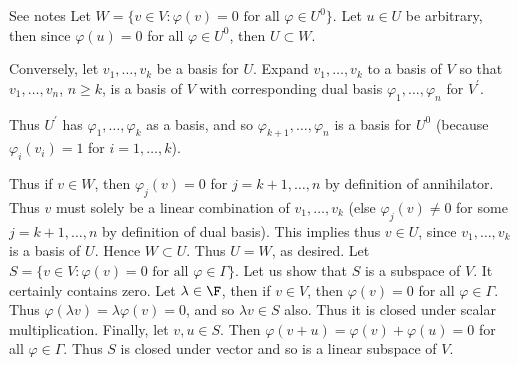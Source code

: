 \documentclass{book}
\begin{document}
\begin{enumerate}[label=\arabic*)]
\begin{enumerate}[label=\alph*)]
      \end{enumerate}
    \ii
      See notes
    \ii
      Let $W = \{v \in V: \varphi(v) = 0 \text{ for all } \varphi \in U^0\}$. Let $u \in U$ be arbitrary, then since $\varphi(u) = 0$ for all $\varphi \in U^0$, then $U \subset W$. 

      Conversely, let $v_1, \dots, v_k$ be a basis for $U$. Expand $v_1, \dots, v_k$ to a basis of $V$ so that $v_1, \dots, v_n$, $n \geq k$, is a basis of $V$ with corresponding dual basis
      $\varphi_1, \dots, \varphi_n$ for $V^{\prime}$. 

      Thus $U^{\prime}$ has $\varphi_1, \dots, \varphi_k$ as a basis, and so $\varphi_{k + 1}, \dots, \varphi_{n}$ is a basis for $U^0$ (because $\varphi_i(v_i) = 1$ for $i = 1, \dots, k$). 

      Thus if $v \in W$, then $\varphi_j(v) = 0$ for $j = k + 1, \dots, n$ by definition of annihilator. Thus $v$ must solely be a linear combination of $v_1, \dots, v_k$ (else
      $\varphi_{j}(v) \neq 0$ for some $j = k + 1, \dots, n$ by definition of dual basis). This implies thus $v \in U$, since $v_1, \dots, v_k$ is a basis of $U$. Hence $W \subset U$. Thus
      $U = W$, as desired.
    \ii
      Let $S = \{v \in V: \varphi(v) = 0 \text { for all } \varphi \in \Gamma\}$. Let us show that $S$ is a subspace of $V$. It certainly contains zero. Let $\lambda \in \F$, then if $v \in
      V$, then $\varphi(v) = 0$ for all $\varphi \in \Gamma$. Thus $\varphi(\lambda v) = \lambda\varphi(v) = 0$, and so $\lambda v \in S$ also. Thus it is closed under scalar multiplication.
      Finally, let $v, u \in S$. Then $\varphi(v + u) = \varphi(v) + \varphi(u) = 0$ for all $\varphi \in \Gamma$. Thus $S$ is closed under vector and so is a linear subspace of $V$.


\end{enumerate}
\end{document}
